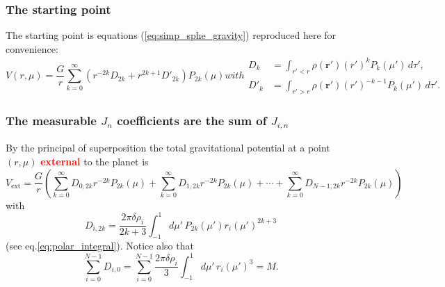 \documentclass[amsmath,amsfonts,rmp,letterpaper]{revtex4}
\newcommand{\V}[1]{\mathbf{#1}} %
\newcommand{\sub}[1]{_{\text{#1}}} %
\newcommand{\arp}{\V{r'}}
\renewcommand{\inf}{\infty}
\newcommand{\red}[1]{\textbf{\textcolor{red}{#1}}}
\newcommand{\ptk}{P_{2k}}
\newcommand{\sumonk}{\sum_{k=0}^{\inf}}
\newcommand{\sumoni}{\sum_{i=0}^{N-1}}
\newcommand{\dro}{\delta\rho}
\newcommand{\intonmu}{\int_{-1}^{1}}
\begin{document}
\subsubsection{The starting point}
The starting point is equations (\ref{eq:simp_sphe_gravity}) reproduced here for
convenience:
\begin{subequations}
\begin{equation}
V(r,\mu)=\frac{G}{r}\sum_{k=0}^{\infty}\left(r^{-2k}D_{2k} +
r^{2k + 1}D'_{2k}\right)P_{2k}(\mu)
\end{equation}
with
\begin{align}
D_k &= \int_{r'<r}\rho(\arp)(r')^kP_k(\mu')\,d\tau',\\
D'_k &= \int_{r'>r}\rho(\arp)(r')^{-k-1}P_k(\mu')\,d\tau'.
\end{align}
\end{subequations}

\subsubsection{The measurable $J_n$ coefficients are the sum of $J_{i,n}$}
By the principal of superposition the total gravitational potential at a point
$(r,\mu)$ \red{external} to the planet is
\begin{equation}
V\sub{ext} = \frac{G}{r}\left(\sum_{k=0}^{\inf}D_{0,2k}r^{-2k}P_{2k}(\mu) + 
\sum_{k=0}^{\inf}D_{1,2k}r^{-2k}\ptk(\mu) + \cdots + 
\sumonk{}D_{N-1,2k}r^{-2k}\ptk(\mu) \right)
\end{equation}
with
\begin{equation}
D_{i,2k} = \frac{2\pi\dro_i}{2k + 3}
\int_{-1}^{1}d\mu'\,\ptk(\mu')r_i(\mu')^{2k + 3}
\end{equation}
(see eq.\eqref{eq:polar_integral}). Notice also that
\begin{equation}\label{eq:M_is_sum_on_D0}
\sum_{i=0}^{N-1}D_{i,0} = \sumoni\frac{2\pi\dro_i}{3}\intonmu{d}\mu'\,r_i(\mu')^3
= M.
\end{equation}
\end{document}
